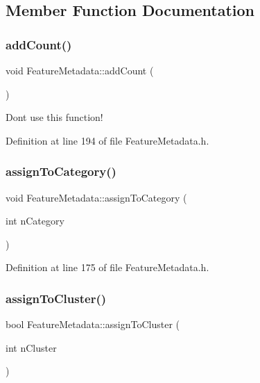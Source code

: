 \subsection{Member Function Documentation}
\mbox{\label{class_feature_metadata_a2c493838e535578c670052b08b61d069}} 
\subsubsection{\texorpdfstring{add\+Count()}{addCount()}}
{\footnotesize\ttfamily void Feature\+Metadata\+::add\+Count (\begin{DoxyParamCaption}{ }\end{DoxyParamCaption})\hspace{0.3cm}{\ttfamily [inline]}}

Don\textquotesingle{}t use this function! 

Definition at line 194 of file Feature\+Metadata.\+h.

\mbox{\label{class_feature_metadata_acc32427e65eab74731498c4a3f0eca34}} 
\subsubsection{\texorpdfstring{assign\+To\+Category()}{assignToCategory()}}
{\footnotesize\ttfamily void Feature\+Metadata\+::assign\+To\+Category (\begin{DoxyParamCaption}\item[{int}]{n\+Category }\end{DoxyParamCaption})\hspace{0.3cm}{\ttfamily [inline]}}



Definition at line 175 of file Feature\+Metadata.\+h.

\mbox{\label{class_feature_metadata_a896922c34a6bf90f4c22b8e9546108dc}} 
\subsubsection{\texorpdfstring{assign\+To\+Cluster()}{assignToCluster()}}
{\footnotesize\ttfamily bool Feature\+Metadata\+::assign\+To\+Cluster (\begin{DoxyParamCaption}\item[{int}]{n\+Cluster }\end{DoxyParamCaption})\hspace{0.3cm}{\ttfamily [inline]}}



